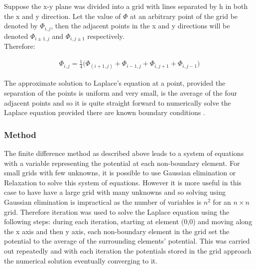\documentclass[aps,twocolumn,pre,nofootinbib,10pt]{revtex4-1}
\begin{document}
Suppose the x-y plane was divided into a grid with lines separated by h in both the x and y direction. Let the value of \(\Phi\) at an arbitrary point of the grid be denoted by \(\Phi_{i,j}\), then the adjacent points in the x and y directions will be denoted \(\Phi_{i\pm1,j}\) and \(\Phi_{i,j\pm1}\) respectively.\\Therefore:

\begin{gather*}
\Phi_{i,j}=\frac{1}{4}\Bigg(\Phi_{(i+1,j)}+
\Phi_{i-1,j}+\Phi_{i,j+1}+\Phi_{i,j-1}\Bigg)
\end{gather*}

The approximate solution to Laplace's equation at a point, provided the separation of the points is uniform and very small, is the average of the four adjacent points and so it is quite straight forward to numerically solve the Laplace equation provided there are known boundary conditions \cite{compmethods}.

\subsubsection{Method}

The finite difference method as described above leads to a system of equations with a variable representing the potential at each non-boundary element. For small grids with few unknowns, it is possible to use Gaussian elimination or Relaxation \cite{recipes_c} to solve this system of equations. However it is more useful in this case to have have a large grid with many unknowns and so solving using Gaussian elimination is impractical as the number of variables is \(n^2\) for an \(n \times n\) grid. Therefore iteration was used to solve the Laplace equation using the following steps: during each iteration, starting at element (0,0) and moving along the x axis and then y axis, each non-boundary element in the grid set the potential to the average of the surrounding elements' potential. This was carried out repeatedly and with each iteration the potentials stored in the grid approach the numerical solution eventually converging to it.
\end{document}
